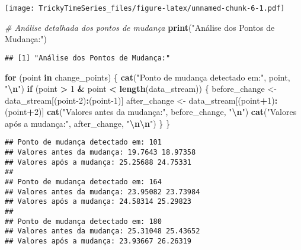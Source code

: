 \documentclass[
]{article}
\newenvironment{Shaded}{\begin{snugshade}}{\end{snugshade}}
\newcommand{\CommentTok}[1]{\textcolor[rgb]{0.56,0.35,0.01}{\textit{#1}}}
\newcommand{\ControlFlowTok}[1]{\textcolor[rgb]{0.13,0.29,0.53}{\textbf{#1}}}
\newcommand{\DecValTok}[1]{\textcolor[rgb]{0.00,0.00,0.81}{#1}}
\newcommand{\FunctionTok}[1]{\textcolor[rgb]{0.13,0.29,0.53}{\textbf{#1}}}
\newcommand{\NormalTok}[1]{#1}
\newcommand{\OtherTok}[1]{\textcolor[rgb]{0.56,0.35,0.01}{#1}}
\newcommand{\SpecialCharTok}[1]{\textcolor[rgb]{0.81,0.36,0.00}{\textbf{#1}}}
\newcommand{\StringTok}[1]{\textcolor[rgb]{0.31,0.60,0.02}{#1}}
\begin{document}
\texttt{[image: TrickyTimeSeries\_files/figure-latex/unnamed-chunk-6-1.pdf]}

\begin{Shaded}
\begin{Highlighting}[]
\CommentTok{\# Análise detalhada dos pontos de mudança}
\FunctionTok{print}\NormalTok{(}\StringTok{"Análise dos Pontos de Mudança:"}\NormalTok{)}
\end{Highlighting}
\end{Shaded}

\begin{verbatim}
## [1] "Análise dos Pontos de Mudança:"
\end{verbatim}

\begin{Shaded}
\begin{Highlighting}[]
\ControlFlowTok{for}\NormalTok{ (point }\ControlFlowTok{in}\NormalTok{ change\_points) \{}
  \FunctionTok{cat}\NormalTok{(}\StringTok{"Ponto de mudança detectado em:"}\NormalTok{, point, }\StringTok{"}\SpecialCharTok{\textbackslash{}n}\StringTok{"}\NormalTok{)}
  \ControlFlowTok{if}\NormalTok{ (point }\SpecialCharTok{\textgreater{}} \DecValTok{1} \SpecialCharTok{\&}\NormalTok{ point }\SpecialCharTok{\textless{}} \FunctionTok{length}\NormalTok{(data\_stream)) \{}
\NormalTok{    before\_change }\OtherTok{\textless{}{-}}\NormalTok{ data\_stream[(point}\DecValTok{{-}2}\NormalTok{)}\SpecialCharTok{:}\NormalTok{(point}\DecValTok{{-}1}\NormalTok{)]}
\NormalTok{    after\_change }\OtherTok{\textless{}{-}}\NormalTok{ data\_stream[(point}\SpecialCharTok{+}\DecValTok{1}\NormalTok{)}\SpecialCharTok{:}\NormalTok{(point}\SpecialCharTok{+}\DecValTok{2}\NormalTok{)]}
    \FunctionTok{cat}\NormalTok{(}\StringTok{"Valores antes da mudança:"}\NormalTok{, before\_change, }\StringTok{"}\SpecialCharTok{\textbackslash{}n}\StringTok{"}\NormalTok{)}
    \FunctionTok{cat}\NormalTok{(}\StringTok{"Valores após a mudança:"}\NormalTok{, after\_change, }\StringTok{"}\SpecialCharTok{\textbackslash{}n\textbackslash{}n}\StringTok{"}\NormalTok{)}
\NormalTok{  \}}
\NormalTok{\}}
\end{Highlighting}
\end{Shaded}

\begin{verbatim}
## Ponto de mudança detectado em: 101 
## Valores antes da mudança: 19.7643 18.97358 
## Valores após a mudança: 25.25688 24.75331 
## 
## Ponto de mudança detectado em: 164 
## Valores antes da mudança: 23.95082 23.73984 
## Valores após a mudança: 24.58314 25.29823 
## 
## Ponto de mudança detectado em: 180 
## Valores antes da mudança: 25.31048 25.43652 
## Valores após a mudança: 23.93667 26.26319
\end{verbatim}
\end{document}
